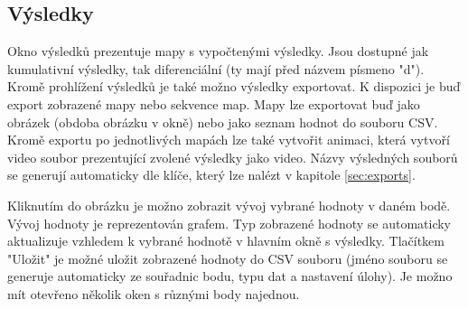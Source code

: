 \documentclass[a4paper,12pt]{article}
\begin{document}
\subsection{Výsledky}
\begin{figure}[H]
\end{figure}
Okno výsledků prezentuje mapy s vypočtenými výsledky. Jsou dostupné jak kumulativní výsledky, tak diferenciální (ty mají před názvem písmeno "d"). Kromě prohlížení výsledků je také možno výsledky exportovat. K dispozici je buď export zobrazené mapy nebo sekvence map. Mapy lze exportovat buď jako obrázek (obdoba obrázku v okně) nebo jako seznam hodnot do souboru CSV. Kromě exportu po jednotlivých mapách lze také vytvořit animaci, která vytvoří video soubor prezentující zvolené výsledky jako video. Názvy výsledných souborů se generují automaticky dle klíče, který lze nalézt v kapitole \ref{sec:exports}.
\begin{figure}[H]
\end{figure}
Kliknutím do obrázku je možno zobrazit vývoj vybrané hodnoty v daném bodě. Vývoj hodnoty je reprezentován grafem. Typ zobrazené hodnoty se automaticky aktualizuje vzhledem k vybrané hodnotě v hlavním okně s výsledky. Tlačítkem "Uložit" je možné uložit zobrazené hodnoty do CSV souboru (jméno souboru se generuje automaticky ze souřadnic bodu, typu dat a nastavení úlohy). Je možno mít otevřeno několik oken s různými body najednou.
\newpage
\end{document}
